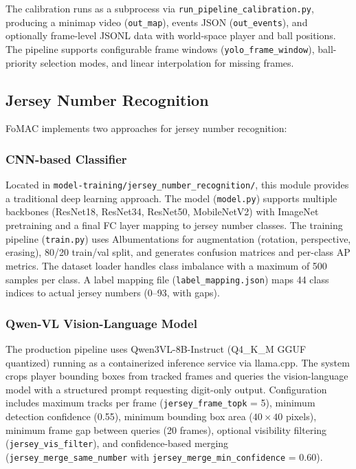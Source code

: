 \documentclass[10pt,twocolumn,a4paper]{article}
\begin{document}
The calibration runs as a subprocess via \texttt{run\_pipeline\_calibration.py}, producing a minimap video (\texttt{out\_map}), events JSON (\texttt{out\_events}), and optionally frame-level JSONL data with world-space player and ball positions. The pipeline supports configurable frame windows (\texttt{yolo\_frame\_window}), ball-priority selection modes, and linear interpolation for missing frames.

\subsection{Jersey Number Recognition}

FoMAC implements two approaches for jersey number recognition:

\subsubsection{CNN-based Classifier}
Located in \texttt{model-training/jersey\_number\_recognition/}, this module provides a traditional deep learning approach. The model (\texttt{model.py}) supports multiple backbones (ResNet18, ResNet34, ResNet50, MobileNetV2) with ImageNet pretraining and a final FC layer mapping to jersey number classes. The training pipeline (\texttt{train.py}) uses Albumentations for augmentation (rotation, perspective, erasing), 80/20 train/val split, and generates confusion matrices and per-class AP metrics. The dataset loader handles class imbalance with a maximum of 500 samples per class. A label mapping file (\texttt{label\_mapping.json}) maps 44 class indices to actual jersey numbers (0--93, with gaps).

\subsubsection{Qwen-VL Vision-Language Model}
The production pipeline uses Qwen3VL-8B-Instruct (Q4\_K\_M GGUF quantized) running as a containerized inference service via llama.cpp. The system crops player bounding boxes from tracked frames and queries the vision-language model with a structured prompt requesting digit-only output. Configuration includes maximum tracks per frame (\texttt{jersey\_frame\_topk} = 5), minimum detection confidence (0.55), minimum bounding box area ($40 \times 40$ pixels), minimum frame gap between queries (20 frames), optional visibility filtering (\texttt{jersey\_vis\_filter}), and confidence-based merging (\texttt{jersey\_merge\_same\_number} with \texttt{jersey\_merge\_min\_confidence} = 0.60).
\end{document}
